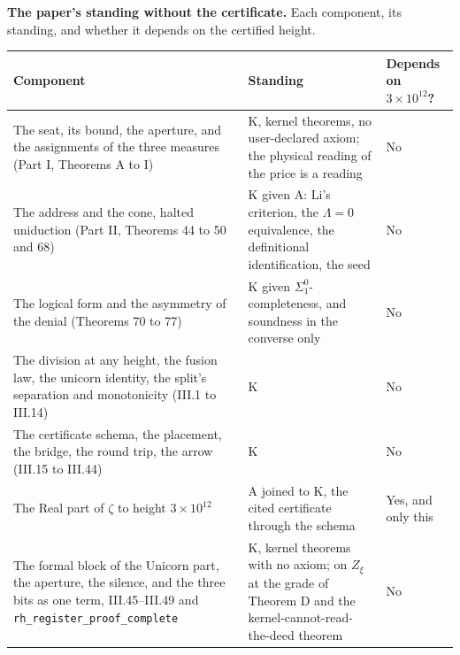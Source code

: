 \documentclass[10pt,twocolumn]{article}
\begin{document}
\begin{table}[!t]
\centering\small
\renewcommand{\arraystretch}{1.12}
\raggedright \textbf{The paper's standing without the certificate.} Each component, its standing, and whether it depends on the certified height.\par\smallskip
\begin{tabularx}{\textwidth}{@{}L P{0.30\textwidth} P{0.13\textwidth}@{}}
\toprule
\textbf{Component} & \textbf{Standing} & \textbf{Depends on $3 \times 10^{12}$?} \\
\midrule
The seat, its bound, the aperture, and the assignments of the three measures (Part I, Theorems A to I) & K, kernel theorems, no user-declared axiom; the physical reading of the price is a reading & No \\
The address and the cone, halted uniduction (Part II, Theorems 44 to 50 and 68) & K given A: Li's criterion, the $\Lambda = 0$ equivalence, the definitional identification, the seed & No \\
The logical form and the asymmetry of the denial (Theorems 70 to 77) & K given $\Sigma^0_1$-completeness, and soundness in the converse only & No \\
The division at any height, the fusion law, the unicorn identity, the split's separation and monotonicity (III.1 to III.14) & K & No \\
The certificate schema, the placement, the bridge, the round trip, the arrow (III.15 to III.44) & K & No \\
The Real part of $\zeta$ to height $3 \times 10^{12}$ & A joined to K, the cited certificate through the schema & Yes, and only this \\
The formal block of the Unicorn part, the aperture, the silence, and the three bits as one term, III.45--III.49 and \texttt{rh\_\allowbreak register\_\allowbreak proof\_\allowbreak complete} & K, kernel theorems with no axiom; on $Z_\xi$ at the grade of Theorem D and the kernel-cannot-read-the-deed theorem & No \\
\bottomrule
\end{tabularx}
\end{table}

\par\vspace{1.4em}\noindent{\color{accent}\rule{\columnwidth}{0.8pt}}\par{}\vspace{0.5em}\noindent{\color{accent}\rule{\columnwidth}{0.8pt}}\par\vspace{1.0em}
\end{document}

